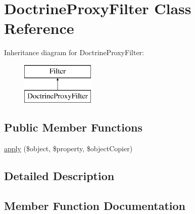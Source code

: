 \hypertarget{class_deep_copy_1_1_filter_1_1_doctrine_1_1_doctrine_proxy_filter}{}\section{Doctrine\+Proxy\+Filter Class Reference}
\label{class_deep_copy_1_1_filter_1_1_doctrine_1_1_doctrine_proxy_filter}
Inheritance diagram for Doctrine\+Proxy\+Filter\+:\begin{figure}[H]
\begin{center}
\leavevmode
\includegraphics[height=2.000000cm]{class_deep_copy_1_1_filter_1_1_doctrine_1_1_doctrine_proxy_filter}
\end{center}
\end{figure}
\subsection*{Public Member Functions}
\begin{DoxyCompactItemize}
\item 
\mbox{\hyperlink{class_deep_copy_1_1_filter_1_1_doctrine_1_1_doctrine_proxy_filter_a360932fe7f9488472623d76aa7da2a25}{apply}} (\$object, \$property, \$object\+Copier)
\end{DoxyCompactItemize}


\subsection{Detailed Description}


\subsection{Member Function Documentation}
\mbox{\label{class_deep_copy_1_1_filter_1_1_doctrine_1_1_doctrine_proxy_filter_a360932fe7f9488472623d76aa7da2a25}} 

